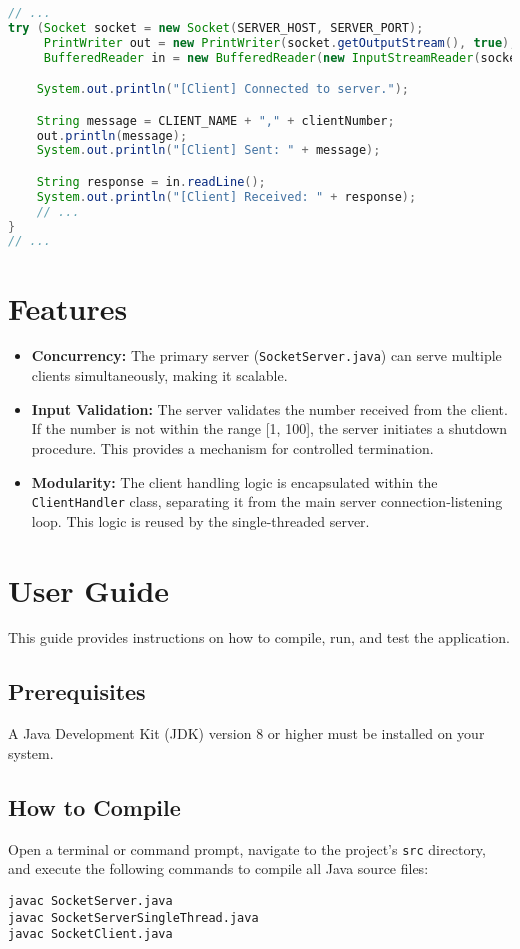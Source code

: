 \documentclass{article}
\begin{document}
\begin{lstlisting}[language=Java, caption={SocketClient communication logic}]
// ...
try (Socket socket = new Socket(SERVER_HOST, SERVER_PORT);
     PrintWriter out = new PrintWriter(socket.getOutputStream(), true);
     BufferedReader in = new BufferedReader(new InputStreamReader(socket.getInputStream()))) {

    System.out.println("[Client] Connected to server.");

    String message = CLIENT_NAME + "," + clientNumber;
    out.println(message);
    System.out.println("[Client] Sent: " + message);

    String response = in.readLine();
    System.out.println("[Client] Received: " + response);
    // ...
}
// ...
\end{lstlisting}

\section{Features}
\begin{itemize}
    \item \textbf{Concurrency:} The primary server (\texttt{SocketServer.java}) can serve multiple clients simultaneously, making it scalable.
    \item \textbf{Input Validation:} The server validates the number received from the client. If the number is not within the range [1, 100], the server initiates a shutdown procedure. This provides a mechanism for controlled termination.
    \item \textbf{Modularity:} The client handling logic is encapsulated within the \texttt{ClientHandler} class, separating it from the main server connection-listening loop. This logic is reused by the single-threaded server.
\end{itemize}

\section{User Guide}

This guide provides instructions on how to compile, run, and test the application.

\subsection{Prerequisites}
A Java Development Kit (JDK) version 8 or higher must be installed on your system.

\subsection{How to Compile}
Open a terminal or command prompt, navigate to the project's \texttt{src} directory, and execute the following commands to compile all Java source files:
\begin{verbatim}
javac SocketServer.java
javac SocketServerSingleThread.java
javac SocketClient.java
\end{verbatim}
\end{document}
